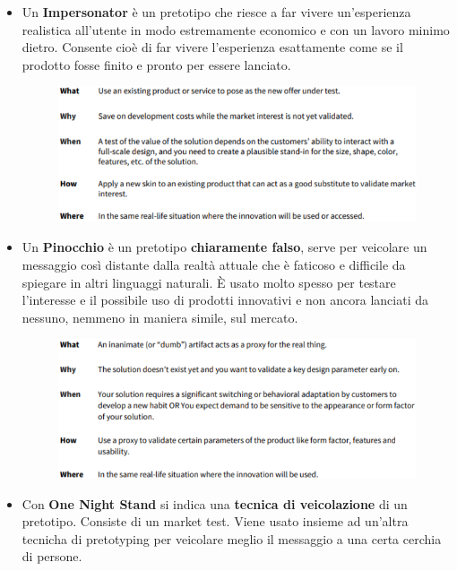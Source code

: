 \documentclass[a4paper,11pt,oneside]{book}
\begin{document}
\begin{itemize}
	\item Un \textbf{Impersonator} è un pretotipo che riesce a far vivere un'esperienza realistica all'utente in modo estremamente economico e con un lavoro minimo dietro. Consente cioè di
	      far vivere l'esperienza esattamente come se il prodotto fosse finito e pronto per essere lanciato.

	      \begin{figure}[!h]
		      \centering
		      \includegraphics[scale=0.42]{immagini/Impersonator.png}
	      \end{figure}

	      \pagebreak

	\item Un \textbf{Pinocchio} è un pretotipo \textbf{chiaramente falso}, serve per veicolare un messaggio così distante dalla realtà attuale che è faticoso e difficile da spiegare in altri linguaggi naturali. È usato molto spesso per testare l'interesse e il possibile uso di prodotti innovativi e non ancora lanciati da nessuno, nemmeno in maniera simile, sul mercato.

	      \begin{figure}[!h]
		      \centering
		      \includegraphics[scale=0.5]{immagini/Pinocchio.png}
	      \end{figure}

	\item Con \textbf{One Night Stand} si indica una \textbf{tecnica di veicolazione} di un pretotipo. Consiste di un market test.
	      Viene usato insieme ad un'altra tecnicha di pretotyping per veicolare meglio il messaggio a una certa cerchia di persone.


\end{itemize}
\end{document}
